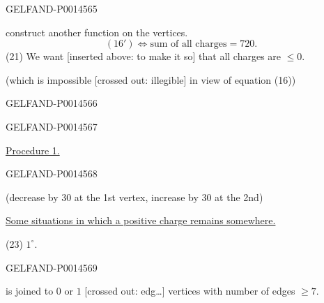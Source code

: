 \begin{GelfandAdjacentEvidence}{GELFAND-P001456}{5}


 construct another function on the vertices.
\[
(16')\Longleftrightarrow\text{sum of all charges}=720.
\]
(21) We want [inserted above: to make it so] that all charges are \(\leq0\).

(which is impossible [crossed out: illegible] in view of equation (16))
\end{GelfandAdjacentEvidence}
\begin{GelfandAdjacentEvidence}{GELFAND-P001456}{6}

\end{GelfandAdjacentEvidence}
\begin{GelfandAdjacentEvidence}{GELFAND-P001456}{7}


\uline{Procedure 1.}
\end{GelfandAdjacentEvidence}
\begin{GelfandAdjacentEvidence}{GELFAND-P001456}{8}

(decrease by 30 at the 1st vertex, increase by 30 at the 2nd)

\uline{Some situations in which a positive charge remains somewhere.}

(23) \(1^\circ\).
\end{GelfandAdjacentEvidence}
\begin{GelfandAdjacentEvidence}{GELFAND-P001456}{9}

is joined to \(0\) or \(1\) [crossed out: edg…] vertices with number of edges \(\geqslant7\).
\end{GelfandAdjacentEvidence}

